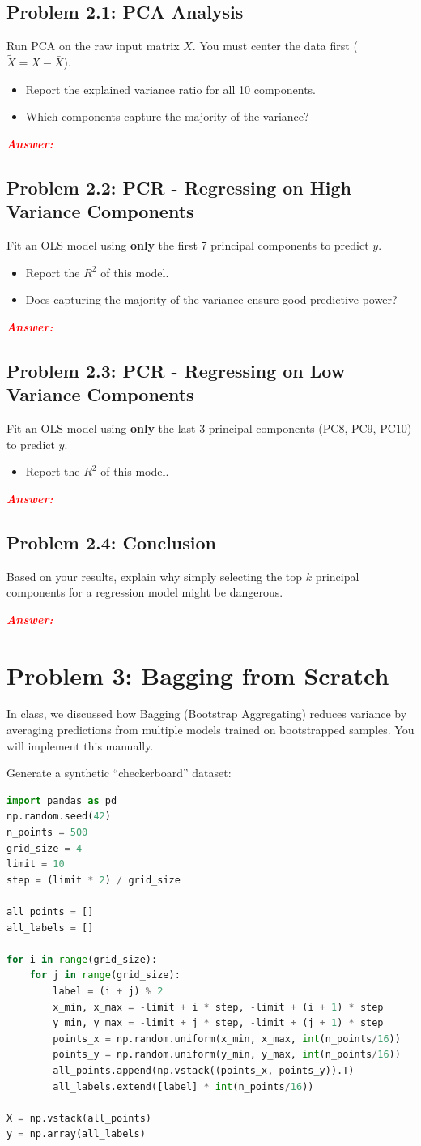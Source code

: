 \documentclass[11pt, letterpaper]{article}
\newcommand{\problem}[1]{\section*{Problem #1}}
\newcommand{\subproblem}[1]{\subsection*{Problem #1}}
\newcommand{\answer}{\textbf{\textit{\textcolor{red}{Answer:}}}}
\begin{document}
\subproblem{2.1: PCA Analysis}
Run PCA on the raw input matrix $X$. You must center the data first ($\tilde{X} = X - \bar{X}$). 
\begin{itemize}
    \item Report the explained variance ratio for all 10 components.
    \item Which components capture the majority of the variance?
\end{itemize}

\answer

\subproblem{2.2: PCR - Regressing on High Variance Components}
Fit an OLS model using \textbf{only} the first 7 principal components to predict $y$.
\begin{itemize}
    \item Report the $R^2$ of this model.
    \item Does capturing the majority of the variance ensure good predictive power?
\end{itemize}

\answer

\subproblem{2.3: PCR - Regressing on Low Variance Components}
Fit an OLS model using \textbf{only} the last 3 principal components (PC8, PC9, PC10) to predict $y$.
\begin{itemize}
    \item Report the $R^2$ of this model.
\end{itemize}

\answer

\subproblem{2.4: Conclusion}
Based on your results, explain why simply selecting the top $k$ principal components for a regression model might be dangerous.

\answer

\problem{3: Bagging from Scratch}

In class, we discussed how Bagging (Bootstrap Aggregating) reduces variance by averaging predictions from multiple models trained on bootstrapped samples. You will implement this manually.

Generate a synthetic ``checkerboard'' dataset:
    \begin{lstlisting}[language=Python]
import pandas as pd
np.random.seed(42)
n_points = 500
grid_size = 4
limit = 10
step = (limit * 2) / grid_size

all_points = []
all_labels = []

for i in range(grid_size):
    for j in range(grid_size):
        label = (i + j) % 2
        x_min, x_max = -limit + i * step, -limit + (i + 1) * step
        y_min, y_max = -limit + j * step, -limit + (j + 1) * step
        points_x = np.random.uniform(x_min, x_max, int(n_points/16))
        points_y = np.random.uniform(y_min, y_max, int(n_points/16))
        all_points.append(np.vstack((points_x, points_y)).T)
        all_labels.extend([label] * int(n_points/16))

X = np.vstack(all_points)
y = np.array(all_labels)\end{lstlisting}
\end{document}
